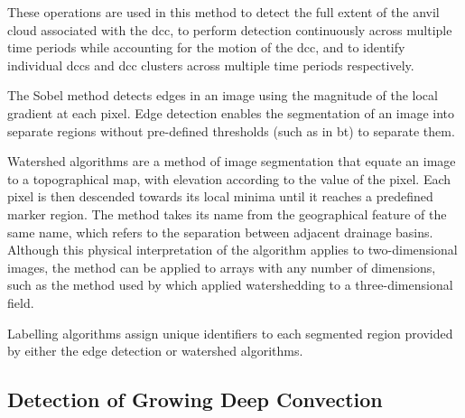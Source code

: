 These operations are used in this method to detect the full extent of the anvil cloud associated with the \acrshort{dcc}, to perform detection continuously across multiple time periods while accounting for the motion of the \acrshort{dcc}, and to identify individual \acrshort{dcc}s and \acrshort{dcc} clusters across multiple time periods respectively.

The Sobel method detects edges in an image using the magnitude of the local gradient at each pixel.
Edge detection enables the segmentation of an image into separate regions without pre-defined thresholds (such as in \acrshort{bt}) to separate them.

Watershed algorithms are a method of image segmentation that equate an image to a topographical map, with elevation according to the value of the pixel.
Each pixel is then descended towards its local minima until it reaches a predefined marker region.
The method takes its name from the geographical feature of the same name, which refers to the separation between adjacent drainage basins.
Although this physical interpretation of the algorithm applies to two-dimensional images, the method can be applied to arrays with any number of dimensions, such as the method used by \citet{fiolleau_algorithm_2013} which applied watershedding to a three-dimensional field.

Labelling algorithms assign unique identifiers to each segmented region provided by either the edge detection or watershed algorithms.

\subsection{Detection of Growing Deep Convection}

